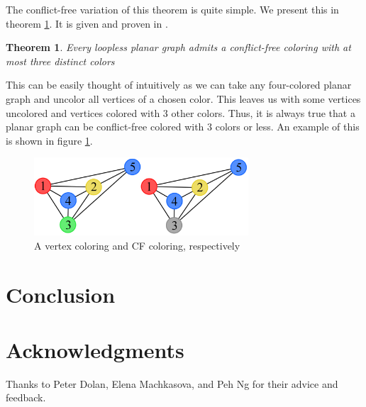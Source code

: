 \documentclass{sig-alternate}
\newtheorem{theorem}{Theorem}
\begin{document}
The conflict-free variation of this theorem is quite simple. We present this in theorem \ref{thm:four-cf}. It is given and proven in \cite{abel2017three}.

\begin{theorem} \label{thm:four-cf}
Every loopless planar graph admits a conflict-free coloring with at most three distinct colors
\end{theorem}

This can be easily thought of intuitively as we can take any four-colored planar graph and uncolor all vertices of a chosen color. This leaves us with some vertices uncolored and vertices colored with 3 other colors. Thus, it is always true that a planar graph can be conflict-free colored with 3 colors or less. An example of this is shown in figure \ref{fig:four}.

\begin{figure}[h]
	\centering
	\includegraphics[width=8cm,trim=4 4 4 4,clip]{../figures/four.pdf}
	\caption{A vertex coloring and CF coloring, respectively}\label{fig:four}
\end{figure}


\section{Conclusion}
\label{sec:conclusion}

\section{Acknowledgments}
Thanks to Peter Dolan, Elena Machkasova, and Peh Ng for their advice and feedback.



\end{document}
